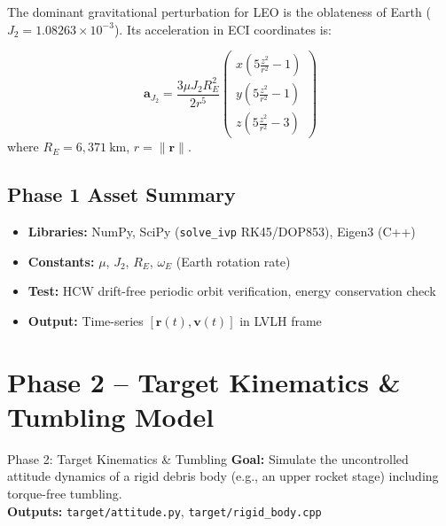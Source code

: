 \documentclass[12pt, a4paper]{article}
\newcommand{\vr}{\mathbf{r}}
\newcommand{\vv}{\mathbf{v}}
\begin{document}
The dominant gravitational perturbation for LEO is the oblateness of Earth
($J_2 = 1.08263 \times 10^{-3}$). Its acceleration in ECI coordinates is:

\begin{formulabox}[title=$J_2$ Perturbing Acceleration]
\begin{equation}
\mathbf{a}_{J_2} = \frac{3\mu J_2 R_E^2}{2r^5}
\begin{pmatrix}
x\!\left(5\frac{z^2}{r^2} - 1\right)\\[4pt]
y\!\left(5\frac{z^2}{r^2} - 1\right)\\[4pt]
z\!\left(5\frac{z^2}{r^2} - 3\right)
\end{pmatrix}
\end{equation}
where $R_E = 6{,}371\ \mathrm{km}$, $r = \|\vr\|$.
\end{formulabox}

\subsection{Phase 1 Asset Summary}
\begin{assetbox}[title=Phase 1 Assets]
\begin{itemize}[leftmargin=1.5em, itemsep=2pt]
    \item \textbf{Libraries:} NumPy, SciPy (\texttt{solve\_ivp} RK45/DOP853),
          Eigen3 (C++)
    \item \textbf{Constants:} $\mu$, $J_2$, $R_E$, $\omega_E$ (Earth rotation rate)
    \item \textbf{Test:} HCW drift-free periodic orbit verification,
          energy conservation check
    \item \textbf{Output:} Time-series $[\vr(t), \vv(t)]$ in LVLH frame
\end{itemize}
\end{assetbox}

\section{Phase 2 -- Target Kinematics \& Tumbling Model}

\begin{phasebox}{Phase 2: Target Kinematics \& Tumbling}
\textbf{Goal:} Simulate the uncontrolled attitude dynamics of a rigid
debris body (e.g., an upper rocket stage) including torque-free tumbling.\\[0.5em]
\textbf{Outputs:} \texttt{target/attitude.py}, \texttt{target/rigid\_body.cpp}
\end{phasebox}
\end{document}
